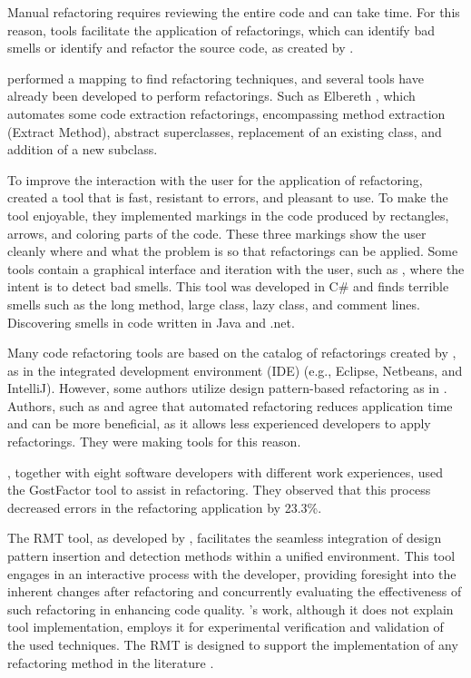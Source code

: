 Manual refactoring requires reviewing the entire code and can take time. For this reason, tools facilitate the application of refactorings, which can identify bad smells or identify and refactor the source code, as created by \textcite{beluzzo2018abordagem}.

\textcite{beluzzo2018abordagem} performed a mapping to find refactoring techniques, and several tools have already been developed to perform refactorings. Such as Elbereth \cite{korman1998elbereth}, which automates some code extraction refactorings, encompassing method extraction (Extract Method), abstract superclasses, replacement of an existing class, and addition of a new subclass.

To improve the interaction with the user for the application of refactoring, \cite{murphy2008breaking} created a tool that is fast, resistant to errors, and pleasant to use. To make the tool enjoyable, they implemented markings in the code produced by rectangles, arrows, and coloring parts of the code. These three markings show the user cleanly where and what the problem is so that refactorings can be applied.
Some tools contain a graphical interface and iteration with the user, such as \textcite{rani2014detection}, where the intent is to detect bad smells. This tool was developed in C\# and finds terrible smells such as the long method, large class, lazy class, and comment lines. Discovering smells in code written in Java and .net. 

Many code refactoring tools are based on the catalog of refactorings created by \textcite{fowler2018refactoring}, as in the integrated development environment (IDE) (e.g., Eclipse, Netbeans, and IntelliJ). However, some authors utilize design pattern-based refactoring as in . Authors, such as \textcite{cinneide2000automated} and \textcite{CHRISTOPOULOU20121201} agree that automated refactoring reduces application time and can be more beneficial, as it allows less experienced developers to apply refactorings. They were making tools for this reason.

\textcite{murphy2008breaking}, together with eight software developers with different work experiences, used the GostFactor tool to assist in refactoring. They observed that this process decreased errors in the refactoring application by 23.3\%.

The RMT tool, as developed by \textcite{beluzzo2018abordagem}, facilitates the seamless integration of design pattern insertion and detection methods within a unified environment. This tool engages in an interactive process with the developer, providing foresight into the inherent changes after refactoring and concurrently evaluating the effectiveness of such refactoring in enhancing code quality. \textcite{sangeetha2019empirical} 's work, although it does not explain tool implementation, employs it for experimental verification and validation of the used techniques. The RMT is designed to support the implementation of any refactoring method in the literature \cite{beluzzo2018abordagem}.

